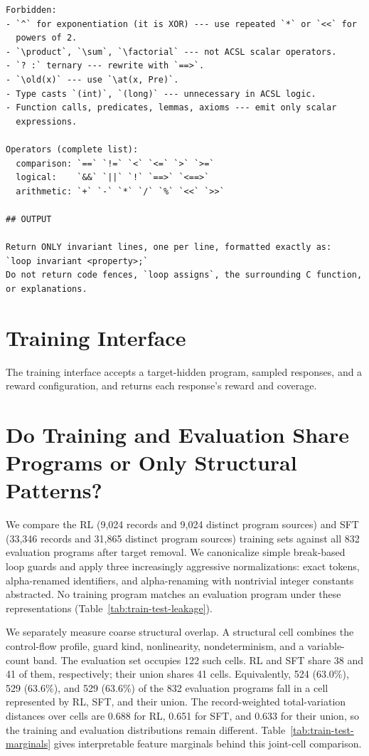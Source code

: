 \begin{promptbox}
\begin{lstlisting}[style=promptstyle]
Forbidden:
- `^` for exponentiation (it is XOR) --- use repeated `*` or `<<` for
  powers of 2.
- `\product`, `\sum`, `\factorial` --- not ACSL scalar operators.
- `? :` ternary --- rewrite with `==>`.
- `\old(x)` --- use `\at(x, Pre)`.
- Type casts `(int)`, `(long)` --- unnecessary in ACSL logic.
- Function calls, predicates, lemmas, axioms --- emit only scalar
  expressions.

Operators (complete list):
  comparison: `==` `!=` `<` `<=` `>` `>=`
  logical:    `&&` `||` `!` `==>` `<==>`
  arithmetic: `+` `-` `*` `/` `%` `<<` `>>`

## OUTPUT

Return ONLY invariant lines, one per line, formatted exactly as:
`loop invariant <property>;`
Do not return code fences, `loop assigns`, the surrounding C function,
or explanations.
\end{lstlisting}
\end{promptbox}

\section{Training Interface}
\label{app:service}

The training interface accepts a target-hidden program, sampled responses,
and a reward configuration, and returns each response's reward and coverage.

\section{Do Training and Evaluation Share Programs or Only Structural Patterns?}
\label{app:data-leakage}

We compare the RL (9,024 records and 9,024 distinct program sources)
and SFT (33,346 records and 31,865 distinct program sources) training sets
against all 832 evaluation programs after target removal.  We canonicalize
simple break-based loop guards and apply three increasingly aggressive
normalizations: exact tokens, alpha-renamed identifiers, and alpha-renaming
with nontrivial integer constants abstracted.  No training program matches
an evaluation program under these representations
(Table~\ref{tab:train-test-leakage}).

We separately measure coarse structural overlap.  A structural cell combines
the control-flow profile, guard kind, nonlinearity, nondeterminism, and a
variable-count band.  The evaluation set occupies 122 such cells.  RL and SFT
share 38 and 41 of them, respectively; their union shares 41 cells.
Equivalently, 524 (63.0\%), 529 (63.6\%), and 529 (63.6\%) of the 832
evaluation programs fall in a cell represented by RL, SFT, and their union.
The record-weighted total-variation distances over cells are 0.688 for RL,
0.651 for SFT, and 0.633 for their union, so the training and evaluation
distributions remain different.  Table~\ref{tab:train-test-marginals} gives
interpretable feature marginals behind this joint-cell comparison.

